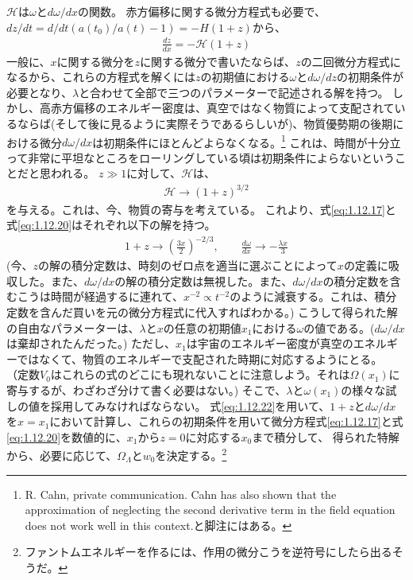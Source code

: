 \documentclass[11pt]{ltjsarticle}
\theoremstyle{plain}
\theoremstyle{break}
\begin{document}
$\mathcal{H}$は$\omega$と$d\omega/dx$の関数。
赤方偏移に関する微分方程式も必要で、$dz/dt = d/dt(a(t_0)/a(t) -1) = -H(1+z)$から、
\begin{align}
  \frac{d z}{d x}=-\mathcal{H}(1+z) \label{eq:1.12.20}
\end{align}%
一般に、$x$に関する微分を$z$に関する微分で書いたならば、$z$の二回微分方程式になるから、これらの方程式を解くには$z$の初期値における$\omega$と$d\omega/dz$の初期条件が必要となり、$\lambda$と合わせて全部で三つのパラメーターで記述される解を持つ。
しかし、高赤方偏移のエネルギー密度は、真空ではなく物質によって支配されているならば(そして後に見るように実際そうであるらしいが)、物質優勢期の後期における微分$d\omega/dx$は初期条件にほとんどよらなくなる。\footnote{R. Cahn, private communication. Cahn has also shown that the approximation of neglecting the second derivative term in the field equation does not work well in this context.と脚注にはある。}
これは、時間が十分立って非常に平坦なところをローリングしている頃は初期条件によらないということだと思われる。
$z \gg 1$に対して、$\mathcal{H}$は、
\begin{align}
  \mathcal{H} \to (1+z)^{3/2}
\end{align}%
を与える。これは、今、物質の寄与を考えている。
これより、式\eqref{eq:1.12.17}と式\eqref{eq:1.12.20}はそれぞれ以下の解を持つ。
\begin{align}
  1+z \rightarrow\left(\frac{3 x}{2}\right)^{-2 / 3}, \qquad \frac{d \omega}{d x} \rightarrow-\frac{\lambda x}{3} \label{eq:1.12.22}
\end{align}%
(今、$z$の解の積分定数は、時刻のゼロ点を適当に選ぶことによって$x$の定義に吸収した。また、$d\omega /dx$の解の積分定数は無視した。また、$d\omega/dx$の積分定数を含むこうは時間が経過するに連れて、$x^{-2} \propto t^{-2}$のように減衰する。これは、積分定数を含んだ買いを元の微分方程式に代入すればわかる。)
こうして得られた解の自由なパラメーターは、$\lambda$と$x$の任意の初期値$x_1$における$\omega$の値である。($d\omega/dx$は棄却されたんだった。)
ただし、$x_1$は宇宙のエネルギー密度が真空のエネルギーではなくて、物質のエネルギーで支配された時期に対応するようにとる。
（定数$V_0$はこれらの式のどこにも現れないことに注意しよう。それは$\Omega(x_1)$に寄与するが、わざわざ分けて書く必要はない。)
そこで、$\lambda$と$\omega(x_1)$の様々な試しの値を採用してみなければならない。
式\eqref{eq:1.12.22}を用いて、$1+z$と$d\omega/dx$を$x = x_1$において計算し、これらの初期条件を用いて微分方程式\eqref{eq:1.12.17}と式\eqref{eq:1.12.20}を数値的に、$x_1$から$z=0$に対応する$x_0$まで積分して、
得られた特解から、必要に応じて、$\Omega_\Lambda$と$w_0$を決定する。\footnote{ファントムエネルギーを作るには、作用の微分こうを逆符号にしたら出るそうだ。}
\end{document}
